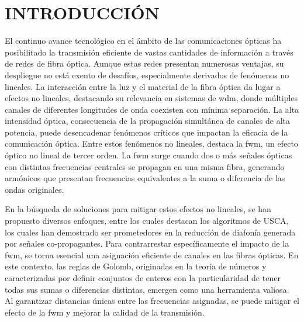 \setcounter{page}{1}

\chapter*{INTRODUCCIÓN}
\label{chap0:introducion}
\justify %

\hspace*{1em} El continuo avance tecnológico en el ámbito de las comunicaciones ópticas ha posibilitado la transmisión eficiente de vastas cantidades de información a través de redes de fibra óptica. Aunque estas redes presentan numerosas ventajas, su despliegue no está exento de desafíos, especialmente derivados de fenómenos no lineales. La interacción entre la luz y el material de la fibra óptica da lugar a efectos no lineales, destacando su relevancia en sistemas de \acrfull{wdm}, donde múltiples canales de diferentes longitudes de onda coexisten con mínima separación. La alta intensidad óptica, consecuencia de la propagación simultánea de canales de alta potencia, puede desencadenar fenómenos críticos que impactan la eficacia de la comunicación óptica. Entre estos fenómenos no lineales, destaca la \acrfull{fwm}, un efecto óptico no lineal de tercer orden. La \acrshort{fwm} surge cuando dos o más señales ópticas con distintas frecuencias centrales se propagan en una misma fibra, generando armónicos que presentan frecuencias equivalentes a la suma o diferencia de las ondas originales.


En la búsqueda de soluciones para mitigar estos efectos no lineales, se han propuesto diversos enfoques, entre los cuales destacan los algoritmos de \acrfull{USCA}, los cuales han demostrado ser prometedores en la reducción de diafonía generada por señales co-propagantes. Para contrarrestar específicamente el impacto de la \acrshort{fwm}, se torna esencial una asignación eficiente de canales en las fibras ópticas. En este contexto, las reglas de Golomb, originadas en la teoría de números y caracterizadas por definir conjuntos de enteros con la particularidad de tener todas sus sumas o diferencias distintas, emergen como una herramienta valiosa. Al garantizar distancias únicas entre las frecuencias asignadas, se puede mitigar el efecto de la \acrshort{fwm} y mejorar la calidad de la transmisión.


